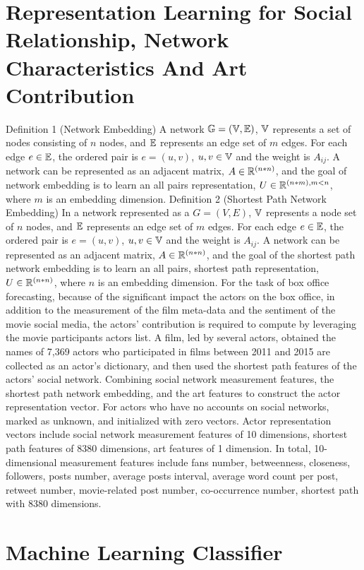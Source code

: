 \documentclass[review]{cvpr}
\begin{document}
\section{Representation Learning for Social Relationship, Network Characteristics And Art Contribution}

Definition 1 (Network Embedding)  A network $\Bbb G=(\Bbb V,\Bbb E)$, $\Bbb V$ represents a set of nodes consisting of $n$ nodes, and $\Bbb E$ represents an edge set of $m$ edges.
For each edge $e\in \Bbb E$, the ordered pair is $e=(u,v)$, $u,v \in \Bbb V$ and the weight is $A_{ij}$.
A network can be represented as an adjacent matrix, $A\in \Bbb R^{(n*n)}$, and the goal of network embedding is to learn an all pairs representation, $U\in \Bbb R^{(n*m), m < n}$, where $m$ is an embedding dimension.
Definition 2 (Shortest Path Network Embedding)  In a network represented as a $G=(V,E)$, $\Bbb V$ represents a node set of $n$ nodes, and $\Bbb E$ represents an edge set of $m$ edges.
For each edge $e\in \Bbb E$, the ordered pair is $e=(u,v)$, $u,v \in \Bbb V$ and the weight is $A_{ij}$.
A network can be represented as an adjacent matrix, $A\in \Bbb R^{(n*n)}$, and the goal of the shortest path network embedding is to learn an all pairs, shortest path representation, $U\in \Bbb R^{(n*n)}$, where $n$ is an embedding dimension.
For the task of box office forecasting, because of the significant impact the actors on the box office, in addition to the measurement of the film meta-data and the sentiment of the movie social media, the actors' contribution is required to compute by leveraging the movie participants actors list.
A film, led by several actors, obtained the names of 7,369 actors who participated in films between 2011 and 2015 are collected as an actor's dictionary, and then used the shortest path features of the actors' social network.
Combining social network measurement features, the shortest path network embedding, and the art features to construct the actor representation vector.
For actors who have no accounts on social networks, marked as unknown, and initialized with zero vectors.
Actor representation vectors include social network measurement features of 10 dimensions, shortest path features of 8380 dimensions, art features of 1 dimension.
In total, 10-dimensional measurement features include fans number, betweenness, closeness, followers, posts number, average posts interval, average word count per post, retweet number, movie-related post number, co-occurrence number, shortest path with 8380 dimensions.

\section{Machine Learning Classifier}
\end{document}
